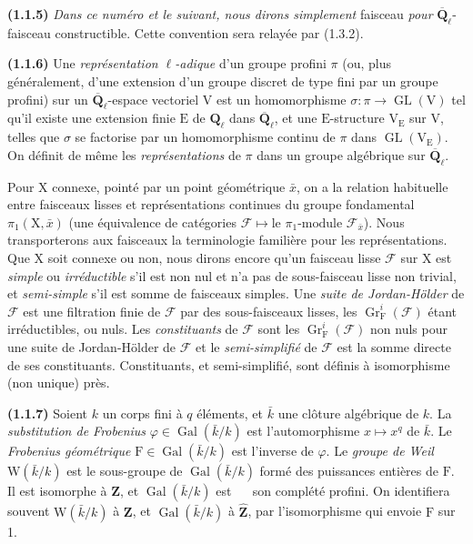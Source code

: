 \documentclass[11pt,leqno]{article}
\newcommand{\Page}[1]{\ifvmode\noindent\else\unskip\ \fi{\footnotesize\textcolor{gray}{[p.\,#1]}}\ \ignorespaces}
\begin{document}
\textbf{(1.1.5)} \textit{Dans ce numéro et le suivant, nous dirons simplement} faisceau \textit{pour} \(\overline{\mathbf{Q}}_\ell\)-faisceau constructible. Cette convention sera relayée par (1.3.2).

\textbf{(1.1.6)} Une \textit{représentation \(\ell\)-adique} d’un groupe profini \(\pi\) (ou, plus généralement, d’une extension d’un groupe discret de type fini par un groupe profini) sur un \(\overline{\mathbf{Q}}_\ell\)-espace vectoriel \(\mathrm{V}\) est un homomorphisme \(\sigma:\pi\to\operatorname{GL}(\mathrm{V})\) tel qu’il existe une extension finie \(\mathrm{E}\) de \(\mathbf{Q}_\ell\) dans \(\overline{\mathbf{Q}}_\ell\), et une \(\mathrm{E}\)-structure \(\mathrm{V}_{\mathrm{E}}\) sur \(\mathrm{V}\), telles que \(\sigma\) se factorise par un homomorphisme continu de \(\pi\) dans \(\operatorname{GL}(\mathrm{V}_{\mathrm{E}})\). On définit de même les \textit{représentations} de \(\pi\) dans un groupe algébrique sur \(\overline{\mathbf{Q}}_\ell\).

Pour \(\mathrm{X}\) connexe, pointé par un point géométrique \(\bar x\), on a la relation habituelle entre faisceaux lisses et représentations continues du groupe fondamental \(\pi_1(\mathrm{X},\bar x)\) (une équivalence de catégories \(\mathscr{F}\mapsto\text{le }\pi_1\text{-module }\mathscr{F}_{\bar x}\)). Nous transporterons aux faisceaux la terminologie familière pour les représentations. Que \(\mathrm{X}\) soit connexe ou non, nous dirons encore qu’un faisceau lisse \(\mathscr{F}\) sur \(\mathrm{X}\) est \textit{simple} ou \textit{irréductible} s’il est non nul et n’a pas de sous-faisceau lisse non trivial, et \textit{semi-simple} s’il est somme de faisceaux simples. Une \textit{suite de Jordan-Hölder} de \(\mathscr{F}\) est une filtration finie de \(\mathscr{F}\) par des sous-faisceaux lisses, les \(\operatorname{Gr}_{\mathrm{F}}^i(\mathscr{F})\) étant irréductibles, ou nuls. Les \textit{constituants} de \(\mathscr{F}\) sont les \(\operatorname{Gr}_{\mathrm{F}}^i(\mathscr{F})\) non nuls pour une suite de Jordan-Hölder de \(\mathscr{F}\) et le \textit{semi-simplifié} de \(\mathscr{F}\) est la somme directe de ses constituants. Constituants, et semi-simplifié, sont définis à isomorphisme (non unique) près.

\textbf{(1.1.7)} Soient \(k\) un corps fini à \(q\) éléments, et \(\bar k\) une clôture algébrique de \(k\). La \textit{substitution de Frobenius} \(\varphi\in\operatorname{Gal}(\bar k/k)\) est l’automorphisme \(x\mapsto x^q\) de \(\bar k\). Le \textit{Frobenius géométrique} \(\mathrm{F}\in\operatorname{Gal}(\bar k/k)\) est l’inverse de \(\varphi\). Le \textit{groupe de Weil} \(\mathrm{W}(\bar k/k)\) est le sous-groupe de \(\operatorname{Gal}(\bar k/k)\) formé des puissances entières de \(\mathrm{F}\). Il est isomorphe à \(\mathbf{Z}\), et \(\operatorname{Gal}(\bar k/k)\) est \Page{151}
son complété profini. On identifiera souvent \(\mathrm{W}(\bar k/k)\) à \(\mathbf{Z}\), et \(\operatorname{Gal}(\bar k/k)\) à \(\widehat{\mathbf{Z}}\), par l’isomorphisme qui envoie \(\mathrm{F}\) sur 1.
\end{document}
